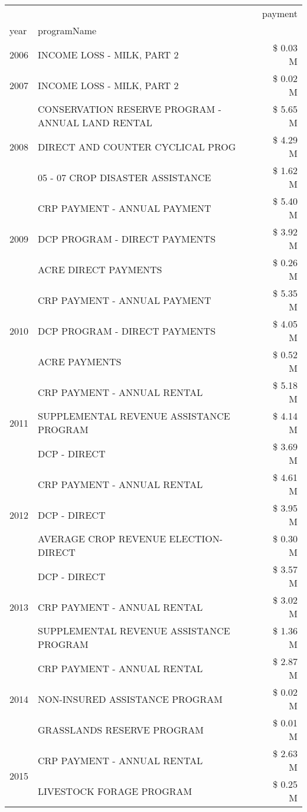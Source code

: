 \begin{tabular}{llr}
\toprule
 &  & payment \\
year & programName &  \\
\midrule
2006 & INCOME LOSS - MILK, PART 2 & \$ 0.03 M \\
\cline{1-3}
2007 & INCOME LOSS - MILK, PART 2 & \$ 0.02 M \\
\cline{1-3}
\multirow[t]{3}{*}{2008} & CONSERVATION RESERVE PROGRAM - ANNUAL LAND RENTAL & \$ 5.65 M \\
 & DIRECT AND COUNTER CYCLICAL PROG & \$ 4.29 M \\
 & 05 - 07 CROP DISASTER ASSISTANCE & \$ 1.62 M \\
\cline{1-3}
\multirow[t]{3}{*}{2009} & CRP PAYMENT - ANNUAL PAYMENT & \$ 5.40 M \\
 & DCP PROGRAM - DIRECT PAYMENTS & \$ 3.92 M \\
 & ACRE DIRECT PAYMENTS & \$ 0.26 M \\
\cline{1-3}
\multirow[t]{3}{*}{2010} & CRP PAYMENT - ANNUAL PAYMENT & \$ 5.35 M \\
 & DCP PROGRAM - DIRECT PAYMENTS & \$ 4.05 M \\
 & ACRE PAYMENTS & \$ 0.52 M \\
\cline{1-3}
\multirow[t]{3}{*}{2011} & CRP PAYMENT - ANNUAL RENTAL & \$ 5.18 M \\
 & SUPPLEMENTAL REVENUE ASSISTANCE PROGRAM & \$ 4.14 M \\
 & DCP - DIRECT & \$ 3.69 M \\
\cline{1-3}
\multirow[t]{3}{*}{2012} & CRP PAYMENT - ANNUAL RENTAL & \$ 4.61 M \\
 & DCP - DIRECT & \$ 3.95 M \\
 & AVERAGE CROP REVENUE ELECTION-DIRECT & \$ 0.30 M \\
\cline{1-3}
\multirow[t]{3}{*}{2013} & DCP - DIRECT & \$ 3.57 M \\
 & CRP PAYMENT - ANNUAL RENTAL & \$ 3.02 M \\
 & SUPPLEMENTAL REVENUE ASSISTANCE PROGRAM & \$ 1.36 M \\
\cline{1-3}
\multirow[t]{3}{*}{2014} & CRP PAYMENT - ANNUAL RENTAL & \$ 2.87 M \\
 & NON-INSURED ASSISTANCE PROGRAM & \$ 0.02 M \\
 & GRASSLANDS RESERVE PROGRAM & \$ 0.01 M \\
\cline{1-3}
\multirow[t]{3}{*}{2015} & CRP PAYMENT - ANNUAL RENTAL & \$ 2.63 M \\
 & LIVESTOCK FORAGE PROGRAM & \$ 0.25 M \\

\end{tabular}
